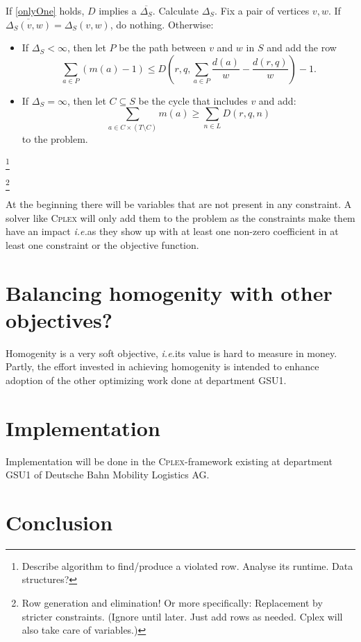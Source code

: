 \documentclass[a4paper]{amsart} %
\def\ie{\emph{i.e.}}
\newcommand{\ol}[1]{\overline{#1}}
\newcommand{\todo}[1]{\footnote{#1}}
\begin{document}
If \ref{onlyOne} holds, \(D\) implies a \(\ol{\Delta_S}\).  Calculate
\(\Delta_S\).  Fix a pair of vertices \(v,w\).  If \(\ol{\Delta_S
  (v,w)} = \Delta_S(v,w)\), do nothing.  Otherwise:
\begin{itemize}
  \item If \(\Delta_S < \infty\), then let \(P\) be the path between \(v\) and \(w\) in \(S\) and add the row
   \begin{equation}
    \sum_{a \in P} (m(a) - 1) \leq D \left(r,q, \sum_{a \in P} \frac{ d \left(a\right)}{w} - \frac{d(r,q)}{w}\right) - 1 \textrm{.}
    \end{equation} 
 \item If \(\Delta_S = \infty\), then let \(C \subseteq S\) be the cycle that includes \(v\) and add:
    \begin{equation}
      \sum_{a \in C \times (T \setminus C)} m(a) \geq \sum_{n \in L} D (r,q, n)
    \end{equation}
    to the problem.
\end{itemize}

\todo{Describe algorithm to find/produce a violated row.  Analyse its
  runtime.  Data structures?}

\todo{Row generation and elimination!  Or more specifically:
  Replacement by stricter constraints.  (Ignore until later.  Just add
  rows as needed.  Cplex will also take care of variables.)}

At the beginning there will be variables that are not present in any
constraint.  A solver like \textsc{Cplex} will only add them to the
problem as the constraints make them have an impact \ie as they show
up with at least one non-zero coefficient in at least one constraint
or the objective function.

\section{Balancing homogenity with other objectives?}
Homogenity is a very soft objective, \ie its value is hard to measure
in money.  Partly, the effort invested in achieving homogenity is
intended to enhance adoption of the other optimizing work done at
department GSU1.

\section{Implementation}

Implementation will be done in the \textsc{Cplex}-framework existing at
department GSU1 of Deutsche Bahn Mobility Logistics AG.
\section{Conclusion}
\end{document}
